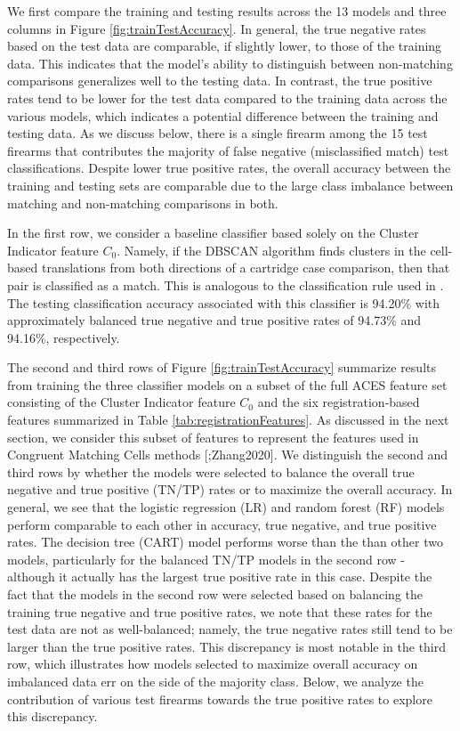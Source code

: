 \documentclass[11pt,]{isuthesis}
\begin{document}
We first compare the training and testing results across the 13 models and three columns in Figure \ref{fig:trainTestAccuracy}.
In general, the true negative rates based on the test data are comparable, if slightly lower, to those of the training data.
This indicates that the model's ability to distinguish between non-matching comparisons generalizes well to the testing data.
In contrast, the true positive rates tend to be lower for the test data compared to the training data across the various models, which indicates a potential difference between the training and testing data.
As we discuss below, there is a single firearm among the 15 test firearms that contributes the majority of false negative (misclassified match) test classifications.
Despite lower true positive rates, the overall accuracy between the training and testing sets are comparable due to the large class imbalance between matching and non-matching comparisons in both.

In the first row, we consider a baseline classifier based solely on the Cluster Indicator feature \(C_0\).
Namely, if the DBSCAN algorithm finds clusters in the cell-based translations from both directions of a cartridge case comparison, then that pair is classified as a match.
This is analogous to the classification rule used in \citet{Zhang2020}.
The testing classification accuracy associated with this classifier is 94.20\% with approximately balanced true negative and true positive rates of 94.73\% and 94.16\%, respectively.

The second and third rows of Figure \ref{fig:trainTestAccuracy} summarize results from training the three classifier models on a subset of the full ACES feature set consisting of the Cluster Indicator feature \(C_0\) and the six registration-based features summarized in Table \ref{tab:registrationFeatures}.
As discussed in the next section, we consider this subset of features to represent the features used in Congruent Matching Cells methods {[}\citet{song_proposed_2013};Zhang2020{]}.
We distinguish the second and third rows by whether the models were selected to balance the overall true negative and true positive (TN/TP) rates or to maximize the overall accuracy.
In general, we see that the logistic regression (LR) and random forest (RF) models perform comparable to each other in accuracy, true negative, and true positive rates.
The decision tree (CART) model performs worse than the than other two models, particularly for the balanced TN/TP models in the second row - although it actually has the largest true positive rate in this case.
Despite the fact that the models in the second row were selected based on balancing the training true negative and true positive rates, we note that these rates for the test data are not as well-balanced; namely, the true negative rates still tend to be larger than the true positive rates.
This discrepancy is most notable in the third row, which illustrates how models selected to maximize overall accuracy on imbalanced data err on the side of the majority class.
Below, we analyze the contribution of various test firearms towards the true positive rates to explore this discrepancy.
\end{document}
